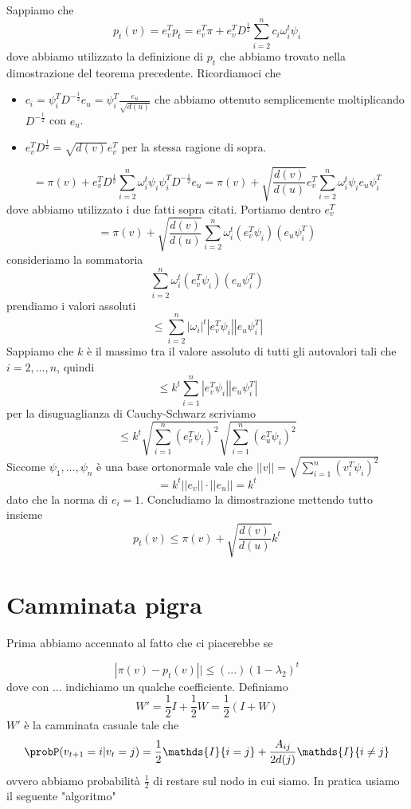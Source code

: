 \documentclass[12pt]{report}
\begin{document}
\begin{dimo}
    Sappiamo che $$p_t(v) = e_v^T p_t = e_v^T \pi + e_v^T D^\frac{1}{2} \sum_{i = 2}^n c_i \omega_i^t \psi_i$$
    dove abbiamo utilizzato la definizione di $p_t$ che abbiamo trovato nella dimostrazione del teorema precedente.
    Ricordiamoci che
    \begin{itemize}
        \item $c_i = \psi_i^T D^{-\frac{1}{2}} e_u = \psi_i^T \frac{e_u}{\sqrt{d(u)}}$ che abbiamo ottenuto semplicemente moltiplicando $D^{-\frac{1}{2}}$ con $e_u$.
        \item $e_v^T D^\frac{1}{2} = \sqrt{d(v)} e_v^T$ per la stessa ragione di sopra.
    \end{itemize}
    $$= \pi(v) + e_v^T D^\frac{1}{2} \sum_{i = 2}^n \omega_i^t  \psi_i \psi_i^T D^{-\frac{1}{2}} e_u = \pi(v) + \sqrt{\frac{d(v)}{d(u)}} e_v^T \sum_{i = 2}^n \omega_i^t \psi_i e_u \psi_i^T $$
    dove abbiamo utilizzato i due fatti sopra citati. Portiamo dentro $e_v^T$
    $$= \pi(v) + \sqrt{\frac{d(v)}{d(u)}} \sum_{i = 2}^n \omega_i^t (e_v^T \psi_i) (e_u \psi_i^T) $$
    consideriamo la sommatoria
    $$ \sum_{i = 2}^n \omega_i^t (e_v^T \psi_i) (e_u \psi_i^T) $$
    prendiamo i valori assoluti
    $$\leq  \sum_{i = 2}^n |\omega_i|^t |e_v^T \psi_i| |e_u \psi_i^T| $$
    Sappiamo che $k$ è il massimo tra il valore assoluto di tutti gli autovalori tali che $i = 2,\dots,n$, quindi
    $$\leq k^t   \sum_{i = 1}^n |e_v^T \psi_i| |e_u \psi_i^T|$$
    per la disuguaglianza di Cauchy-Schwarz scriviamo
    $$\leq k^t \sqrt{\sum_{i = 1}^n (e_v^T \psi_i)^2}\sqrt{\sum_{i = 1}^n (e_u^T \psi_i)^2}$$
    Siccome $\psi_1,\dots,\psi_n$ è una base ortonormale vale che $||v|| = \sqrt{\sum_{i=1}^n (v_i^T \psi_i)^2}$
    $$= k^t ||e_v||\cdot ||e_u|| = k^t$$
    dato che la norma di $e_i = 1$. Concludiamo la dimostrazione mettendo tutto insieme
    $$p_t(v) \leq \pi(v) + \sqrt{\frac{d(v)}{d(u)}}k^t$$
\end{dimo}

\section{Camminata pigra}
Prima abbiamo accennato al fatto che ci piacerebbe se

$$|\pi(v) - p_t(v)|| \leq (...)(1-\lambda_2)^t$$
dove con $...$ indichiamo un qualche coefficiente. Definiamo
$$W' = \frac{1}{2} I + \frac{1}{2} W = \frac{1}{2}(I+W)$$
$W'$ è la camminata casuale tale che 
$$
\probP(v_{t+1} = i | v_t = j) = \frac{1}{2} \mathds{I}\{i=j\} + \frac{A_{ij}}{2d(j)}\mathds{I}\{i\neq j\}
$$
ovvero abbiamo probabilità $\frac{1}{2}$ di restare sul nodo in cui siamo. In pratica usiamo il seguente "algoritmo"
\end{document}
